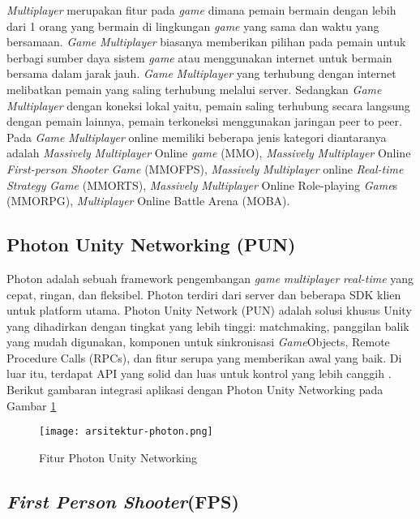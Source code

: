 \textit{Multiplayer} merupakan fitur pada \textit{game} dimana pemain bermain dengan lebih dari 1 orang yang bermain 
di lingkungan \textit{game} yang sama dan waktu yang bersamaan. \textit{Game} \textit{Multiplayer} biasanya memberikan pilihan pada 
pemain untuk berbagi sumber daya sistem \textit{game} atau menggunakan internet untuk bermain bersama dalam jarak 
jauh. \textit{Game} \textit{Multiplayer} yang terhubung dengan internet melibatkan pemain yang saling terhubung melalui server. 
Sedangkan \textit{Game} \textit{Multiplayer} dengan koneksi lokal yaitu, pemain saling terhubung secara langsung dengan 
pemain lainnya, pemain terkoneksi menggunakan jaringan peer to peer. Pada \textit{Game} \textit{Multiplayer} online memiliki 
beberapa jenis kategori diantaranya adalah \textit{Massively} \textit{Multiplayer} Online \textit{game} (MMO), \textit{Massively} \textit{Multiplayer} 
Online \textit{First-person Shooter} \textit{Game} (MMOFPS), \textit{Massively} \textit{Multiplayer} online \textit{Real-time Strategy} \textit{Game}
(MMORTS), \textit{Massively} \textit{Multiplayer} Online Role-playing \textit{Game}s (MMORPG), \textit{Multiplayer} Online Battle Arena
(MOBA)\cite{Ansori}. 

\subsection{Photon Unity Networking (PUN)}
\noindent

Photon adalah sebuah framework pengembangan \textit{game} \textit{multiplayer} \textit{real-time} yang cepat, ringan, dan fleksibel. Photon terdiri dari server dan beberapa SDK klien untuk platform utama.
Photon Unity Network (PUN) adalah solusi khusus Unity yang dihadirkan dengan tingkat yang lebih tinggi: matchmaking, panggilan balik yang mudah digunakan, komponen untuk sinkronisasi \textit{Game}Objects, Remote Procedure Calls (RPCs), dan fitur serupa yang memberikan awal yang baik. Di luar itu, terdapat API yang solid dan luas untuk kontrol yang lebih canggih \cite{pun}.
Berikut gambaran 
integrasi aplikasi dengan Photon Unity Networking pada Gambar \ref{fig:photonni}
\begin{figure}[ht]
	\centering
	\texttt{[image: arsitektur-photon.png]}
	\caption{Fitur Photon Unity Networking}
	\label{fig:photonni}
\end{figure}
\subsection{\textit{First Person Shooter}(FPS)}
\noindent

